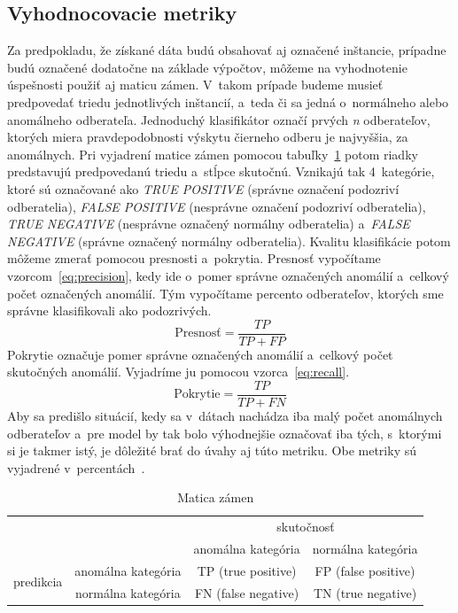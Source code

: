 \documentclass[a4paper,twoside,slovak,12pt,appendix]{article}
\begin{document}
\subsection{Vyhodnocovacie metriky}
Za predpokladu, že získané dáta budú obsahovať aj označené inštancie, prípadne
budú označené dodatočne na základe výpočtov, môžeme na vyhodnotenie úspešnosti
použiť aj maticu zámen. V~takom prípade budeme musieť predpovedať triedu
jednotlivých inštancií, a~teda či sa jedná o~normálneho alebo anomálneho
odberateľa. Jednoduchý klasifikátor označí prvých \textit{n} odberateľov,
ktorých miera pravdepodobnosti výskytu čierneho odberu je najvyššia, za
anomálnych. Pri vyjadrení matice zámen pomocou
tabuľky~\ref{tab:confusion-matrix} potom riadky predstavujú predpovedanú triedu
a~stĺpce skutočnú. Vznikajú tak 4~kategórie, ktoré sú označované ako
\textit{TRUE POSITIVE} (správne označení podozriví odberatelia),
\textit{FALSE POSITIVE} (nesprávne označení podozriví odberatelia),
\textit{TRUE NEGATIVE} (nesprávne označený normálny odberatelia)
a~\textit{FALSE NEGATIVE} (správne označený normálny odberatelia). Kvalitu
klasifikácie potom môžeme zmerať pomocou presnosti a~pokrytia. Presnosť
vypočítame vzorcom~\ref{eq:precision}, kedy ide o~pomer správne označených
anomálií a~celkový počet označených anomálií. Tým vypočítame percento
odberateľov, ktorých sme správne klasifikovali ako podozrivých.
\begin{equation}
	\label{eq:precision}
  \text{Presnosť} = \frac{TP}{TP + FP}
\end{equation}
Pokrytie označuje pomer správne označených anomálií a~celkový počet skutočných
anomálií. Vyjadríme ju pomocou vzorca~\ref{eq:recall}.
\begin{equation}
	\label{eq:recall}
  \text{Pokrytie} = \frac{TP}{TP + FN}
\end{equation}
Aby sa predišlo situácií, kedy sa v~dátach nachádza iba malý počet anomálnych
odberateľov a~pre model by tak bolo výhodnejšie označovať iba tých, s~ktorými si
je takmer istý, je dôležité brať do úvahy aj túto metriku. Obe metriky sú
vyjadrené v~percentách~\cite{Trevizan2015,Wei2006}.

\begin{table}[]
	\centering
	\caption{Matica zámen}
	\label{tab:confusion-matrix}
	\begin{tabular}{|c|c|c|c|}
		\hline
		\multicolumn{2}{|c|}{\multirow{2}{*}{}} 									 & \multicolumn{2}{c|}{skutočnosť} 							 \\ \cline{3-4}
		\multicolumn{2}{|c|}{}       									      			 &  anomálna kategória   &  normálna kategória   \\ \hline
		\multirow{2}{*}[1.2pt]{predikcia}   &  anomálna kategória  &  TP (true positive)   &  FP (false positive)  \\ \cline{2-4}
																				&  normálna kategória  &  FN (false negative)  &  TN (true negative)   \\ \hline
	\end{tabular}
\end{table}
\end{document}
